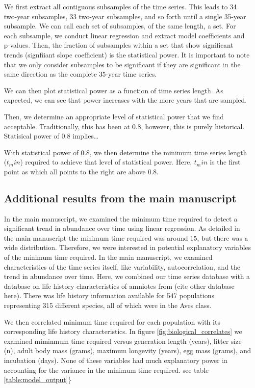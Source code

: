 \documentclass[12pt,]{article}
\begin{document}
We first extract all contiguous subsamples of the time series. This
leads to 34 two-year subsamples, 33 two-year subsamples, and so forth
until a single 35-year subsample. We can call each set of subsamples, of
the same length, a set. For each subsample, we conduct linear regression
and extract model coefficients and p-values. Then, the fraction of
subsamples within a set that show significant trends (signfiiant slope
coefficient) is the statistical power. It is important to note that we
only consider subsamples to be significant if they are significant in
the same direction as the complete 35-year time series.

We can then plot statistical power as a function of time series length.
As expected, we can see that power increases with the more years that
are sampled.

Then, we determine an appropriate level of statistical power that we
find acceptable. Traditionally, this has been at 0.8, however, this is
purely historical. Statisical power of 0.8 implies\ldots{}

With statistical power of 0.8, we then determine the minimum time series
length (\(t_min\)) required to achieve that level of statistical power.
Here, \(t_min\) is the first point as which all points to the right are
above 0.8.

\subsection{Additional results from the main
manuscript}\label{additional-results-from-the-main-manuscript}

In the main manuscript, we examined the minimum time required to detect
a significant trend in abundance over time using linear regression. As
detailed in the main manuscript the minimum time required was around 15,
but there was a wide distribution. Therefore, we were interested in
potential explanatory variables of the minimum time required. In the
main manuscript, we examined characteristics of the time series itself,
like variability, autocorrelation, and the trend in abundance over time.
Here, we combined our time series database with a database on life
history characteristics of amniotes from (cite other database here).
There was life history information available for 547 populations
representing 315 different species, all of which were in the Aves class.

We then correlated minimum time required for each population with its
corresponding life history characteristics. In figure
\ref{fig:biological_correlates} we examined miminmum time required
versus generation length (years), litter size (n), adult body mass
(grams), maximum longevity (years), egg mass (grams), and incubation
(days). None of these variables had much explanatory power in accounting
for the variance in the minimum time required. see table
\ref{table:model_output}\}
\end{document}
